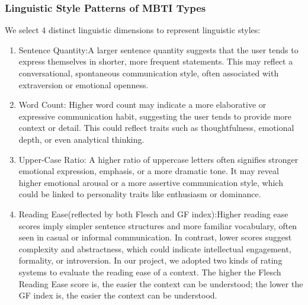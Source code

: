 \documentclass[12pt]{article}
\begin{document}
	\subsubsection{Linguistic Style Patterns of MBTI Types}
	We select 4 distinct linguistic dimensions to represent linguistic styles:
	\begin{enumerate}
		\item Sentence Quantity:A larger sentence quantity suggests that the user tends to express themselves in shorter, more frequent statements. This may reflect a conversational, spontaneous communication style, often associated with extraversion or emotional openness.  
		\item Word Count: Higher word count may indicate a more elaborative or expressive communication habit, suggesting the user tends to provide more context or detail. This could reflect traits such as thoughtfulness, emotional depth, or even analytical thinking.
		\item Upper-Case Ratio: A higher ratio of uppercase letters often signifies stronger emotional expression, emphasis, or a more dramatic tone. It may reveal higher emotional arousal or a more assertive communication style, which could be linked to personality traits like enthusiasm or dominance.
		\item Reading Ease(reflected by both Flesch and GF index):Higher reading ease scores imply simpler sentence structures and more familiar vocabulary, often seen in casual or informal communication. In contrast, lower scores suggest complexity and abstractness, which could indicate intellectual engagement, formality, or introversion. In our project, we adopted two kinds of rating systems to evaluate the reading ease of a context. The higher the Flesch Reading Ease score is, the easier the context can be understood; the lower the GF index is, the easier the context can be understood.
	\end{enumerate}
	
\end{document}
